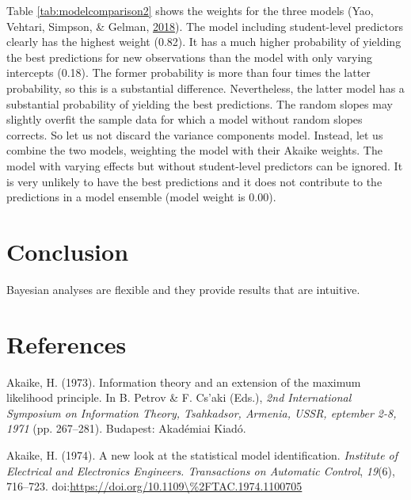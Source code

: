 \documentclass[doc]{apa6}
\begin{document}
Table \ref{tab:modelcomparison2} shows the weights for the three models
(Yao, Vehtari, Simpson, \& Gelman,
\protect\hyperlink{ref-YaoUsingStackingAverage2018}{2018}). The model
including student-level predictors clearly has the highest weight
(0.82). It has a much higher probability of yielding the best
predictions for new observations than the model with only varying
intercepts (0.18). The former probability is more than four times the
latter probability, so this is a substantial difference. Nevertheless,
the latter model has a substantial probability of yielding the best
predictions. The random slopes may slightly overfit the sample data for
which a model without random slopes corrects. So let us not discard the
variance components model. Instead, let us combine the two models,
weighting the model with their Akaike weights. The model with varying
effects but without student-level predictors can be ignored. It is very
unlikely to have the best predictions and it does not contribute to the
predictions in a model ensemble (model weight is 0.00).

\section{Conclusion}\label{conclusion}

Bayesian analyses are flexible and they provide results that are
intuitive.

\newpage

\section{References}\label{references}

\begingroup
\setlength{\parindent}{-0.5in} \setlength{\leftskip}{0.5in}

\hypertarget{refs}{}
\hypertarget{ref-AkaikeInformationtheoryextension1973}{}
Akaike, H. (1973). Information theory and an extension of the maximum
likelihood principle. In B. Petrov \& F. Cs\a'aki (Eds.), \emph{2nd
International Symposium on Information Theory, Tsahkadsor, Armenia,
USSR, eptember 2-8, 1971} (pp. 267--281). Budapest: Akadémiai Kiadó.

\hypertarget{ref-akaikeNewLookStatistical1974}{}
Akaike, H. (1974). A new look at the statistical model identification.
\emph{Institute of Electrical and Electronics Engineers. Transactions on
Automatic Control}, \emph{19}(6), 716--723.
doi:\href{https://doi.org/https://doi.org/10.1109/\%2FTAC.1974.1100705}{https://doi.org/10.1109\textbackslash{}\%2FTAC.1974.1100705}
\end{document}
